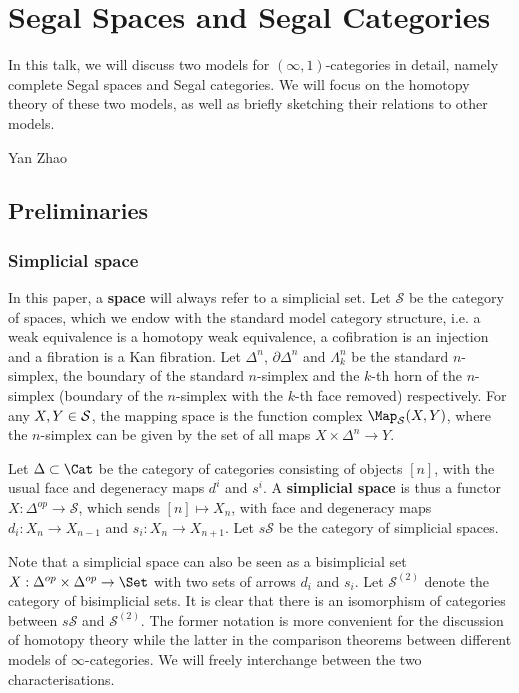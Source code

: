 \chapter{Segal Spaces and Segal Categories}

In this talk, we will discuss two models for $(\infty,1)$-categories in detail, namely complete Segal spaces and Segal categories. We will focus on the homotopy theory of these two models, as well as briefly sketching their relations to other models.

\begin{flushright}
Yan Zhao
\end{flushright}

\section{Preliminaries}
\subsection{Simplicial space}
In this paper, a {\bf space} will always refer to a simplicial set. Let $\mathcal S$ be the category of spaces, which we endow with the standard model category structure, i.e. a weak equivalence is a homotopy weak equivalence, a cofibration is an injection and a fibration is a Kan fibration. Let $\Delta^n$, $\partial\Delta^n$ and $\Lambda^n_k$ be the standard $n$-simplex, the boundary of the standard $n$-simplex and the $k$-th horn of the $n$-simplex (boundary of the $n$-simplex with the $k$-th face removed) respectively. For any $X,Y\in\cal S$, the mapping space is the function complex $\Map_\mathcal S(X,Y)$, where the $n$-simplex can be given by the set of all maps $X\times\Delta^n\to Y$.

Let $\Delta\subset\Cat$ be the category of categories consisting of objects $[n]$, with the usual face and degeneracy maps $d^i$ and $s^i$. A {\bf simplicial space} is thus a functor $X:\Delta^{op}\to\mathcal S$, which sends $[n]\mapsto X_n$, with face and degeneracy maps $d_i:X_n\to X_{n-1}$ and $s_i:X_n\to X_{n+1}$. Let $s\mathcal S$ be the category of simplicial spaces.

Note that a simplicial space can also be seen as a bisimplicial set $X:\Delta^{op}\times\Delta^{op}\to \Set$ with two sets of arrows $d_i$ and $s_i$. Let ${\mathcal S}^{(2)}$ denote the category of bisimplicial sets. It is clear that there is an isomorphism of categories between $s\mathcal S$ and ${\mathcal S}^{(2)}$. The former notation is more convenient for the discussion of homotopy theory while the latter in the comparison theorems between different models of $\infty$-categories. We will freely interchange between the two characterisations.


